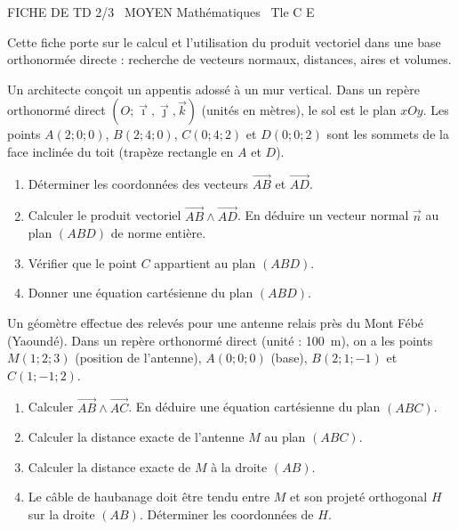 \documentclass[11pt]{article}
\begin{document}
\begin{tcolorbox}[enhanced,colback=popink,colframe=popink,arc=10pt,boxrule=0pt,left=12pt,right=12pt,top=9pt,bottom=9pt]
{\color{white}\popxbold\small FICHE DE TD 2/3 \textbullet\ MOYEN \hfill Mathématiques \textbullet\ Tle C E\par}
\end{tcolorbox}
\vspace{4pt}
\noindent Cette fiche porte sur le calcul et l'utilisation du produit vectoriel dans une base orthonormée directe : recherche de vecteurs normaux, distances, aires et volumes.

\begin{exercice}
Un architecte conçoit un appentis adossé à un mur vertical. Dans un repère orthonormé direct $(O;\vec\imath,\vec\jmath,\vec k)$ (unités en mètres), le sol est le plan $xOy$. Les points $A(2;0;0)$, $B(2;4;0)$, $C(0;4;2)$ et $D(0;0;2)$ sont les sommets de la face inclinée du toit (trapèze rectangle en $A$ et $D$).
\begin{enumerate}
    \item Déterminer les coordonnées des vecteurs $\overrightarrow{AB}$ et $\overrightarrow{AD}$.
    \item Calculer le produit vectoriel $\overrightarrow{AB}\wedge\overrightarrow{AD}$. En déduire un vecteur normal $\vec n$ au plan $(ABD)$ de norme entière.
    \item Vérifier que le point $C$ appartient au plan $(ABD)$.
    \item Donner une équation cartésienne du plan $(ABD)$.
\end{enumerate}
\end{exercice}

\begin{exercice}
Un géomètre effectue des relevés pour une antenne relais près du Mont Fébé (Yaoundé). Dans un repère orthonormé direct (unité : \SI{100}{m}), on a les points $M(1;2;3)$ (position de l'antenne), $A(0;0;0)$ (base), $B(2;1;-1)$ et $C(1;-1;2)$.
\begin{enumerate}
    \item Calculer $\overrightarrow{AB}\wedge\overrightarrow{AC}$. En déduire une équation cartésienne du plan $(ABC)$.
    \item Calculer la distance exacte de l'antenne $M$ au plan $(ABC)$.
    \item Calculer la distance exacte de $M$ à la droite $(AB)$.
    \item Le câble de haubanage doit être tendu entre $M$ et son projeté orthogonal $H$ sur la droite $(AB)$. Déterminer les coordonnées de $H$.
\end{enumerate}
\end{exercice}
\end{document}
